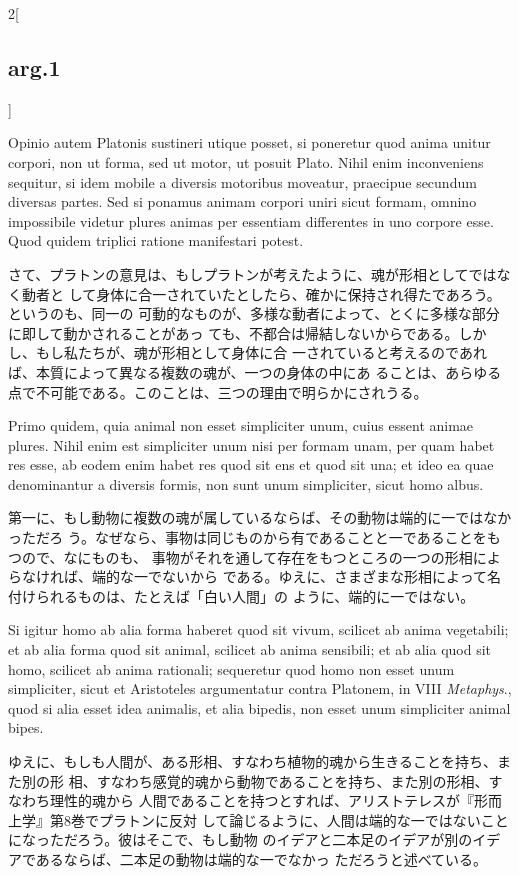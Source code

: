 \documentclass[paper=a4paper,fontsize=10pt,jafontsize=9pt,titlepage]{jlreq}
\begin{document}
\begin{paracol}{2}[\subsection{arg.1}]
\switchcolumn*

Opinio autem Platonis sustineri utique posset, si poneretur quod anima unitur
corpori, non ut forma, sed ut motor, ut posuit Plato. Nihil enim inconveniens
sequitur, si idem mobile a diversis motoribus moveatur, praecipue secundum
diversas partes. Sed si ponamus animam corpori uniri sicut formam, omnino
impossibile videtur plures animas per essentiam differentes in uno corpore
esse. Quod quidem triplici ratione manifestari potest.

\switchcolumn

さて、プラトンの意見は、もしプラトンが考えたように、魂が形相としてではなく動者と
して身体に合一されていたとしたら、確かに保持され得たであろう。というのも、同一の
可動的なものが、多様な動者によって、とくに多様な部分に即して動かされることがあっ
ても、不都合は帰結しないからである。しかし、もし私たちが、魂が形相として身体に合
一されていると考えるのであれば、本質によって異なる複数の魂が、一つの身体の中にあ
ることは、あらゆる点で不可能である。このことは、三つの理由で明らかにされうる。
 
\switchcolumn*

Primo quidem, quia animal non esset simpliciter unum, cuius essent
animae plures. Nihil enim est simpliciter unum nisi per formam unam,
per quam habet res esse, ab eodem enim habet res quod sit ens et quod
sit una; et ideo ea quae denominantur a diversis formis, non sunt unum
 simpliciter, sicut homo albus.

\switchcolumn

第一に、もし動物に複数の魂が属しているならば、その動物は端的に一ではなかっただろ
う。なぜなら、事物は同じものから有であることと一であることをもつので、なにものも、
事物がそれを通して存在をもつところの一つの形相によらなければ、端的な一でないから
である。ゆえに、さまざまな形相によって名付けられるものは、たとえば「白い人間」の
ように、端的に一ではない。
 
\switchcolumn*

 Si igitur homo ab alia forma haberet quod sit vivum, scilicet ab anima
vegetabili; et ab alia forma quod sit animal, scilicet ab anima sensibili; et ab
alia quod sit homo, scilicet ab anima rationali; sequeretur quod homo non esset
unum simpliciter, sicut et Aristoteles argumentatur contra Platonem, in VIII
{\itshape Metaphys}., quod si alia esset idea animalis, et alia bipedis, non
esset unum simpliciter animal bipes.

\switchcolumn

ゆえに、もしも人間が、ある形相、すなわち植物的魂から生きることを持ち、また別の形
相、すなわち感覚的魂から動物であることを持ち、また別の形相、すなわち理性的魂から
人間であることを持つとすれば、アリストテレスが『形而上学』第8巻でプラトンに反対
して論じるように、人間は端的な一ではないことになっただろう。彼はそこで、もし動物
のイデアと二本足のイデアが別のイデアであるならば、二本足の動物は端的な一でなかっ
ただろうと述べている。
 

\end{paracol}
\end{document}
